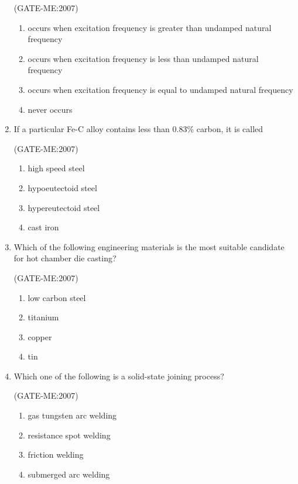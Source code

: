 \documentclass[journal,12pt,onecolumn]{IEEEtran}
\theoremstyle{remark}
\begin{document}
\begin{enumerate}
	\hfill{(GATE-ME:2007)}

\begin{enumerate}
    \item occurs when excitation frequency is greater than undamped natural frequency
    \item occurs when excitation frequency is less than undamped natural frequency
    \item occurs when excitation frequency is equal to undamped natural frequency
    \item never occurs
\end{enumerate}

\item If a particular Fe-C alloy contains less than 0.83\% carbon, it is called

	\hfill{(GATE-ME:2007)}
	\begin{multicols}{2}
\begin{enumerate}
    \item high speed steel
    \item hypoeutectoid steel
    \item hypereutectoid steel
    \item cast iron
\end{enumerate}
\end{multicols}

\item Which of the following engineering materials is the most suitable candidate for hot chamber die casting? 

	\hfill{(GATE-ME:2007)}
	\begin{multicols}{2}
\begin{enumerate}
    \item low carbon steel
    \item titanium
    \item copper
    \item tin
\end{enumerate}
\end{multicols}

\item Which one of the following is a solid-state joining process?

	\hfill{(GATE-ME:2007)}
	\begin{multicols}{2}
\begin{enumerate}
    \item gas tungsten arc welding
    \item resistance spot welding
    \item friction welding
    \item submerged arc welding
\end{enumerate}
\end{multicols}

  	
\end{enumerate}
\end{document}
